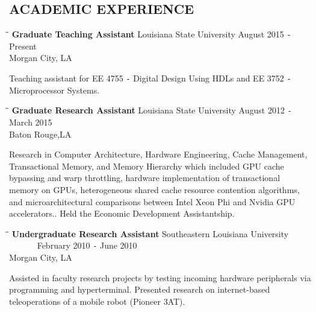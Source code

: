 \documentclass{res}
\begin{document}
\begin{resume}
\section{ACADEMIC EXPERIENCE}
	\vspace{-0.1in}	
	\begin{tabbing}
		\hspace{2.3in}\= \hspace{2.35in}\= \kill %
		{\bf Graduate Teaching Assistant} \>Louisiana State University \> August 2015 \texttt{-} Present\\
		\>Morgan City, LA
	\end{tabbing}\vspace{-20pt}
	Teaching assistant for EE 4755 \texttt{-} Digital Design Using HDLs and EE 3752 \texttt{-} Microprocessor Systems.
	\begin{tabbing}
		\hspace{2.3in}\= \hspace{2.1in}\= \kill %
		{\bf Graduate Research Assistant} \>Louisiana State University     \>August 2012 \texttt{-} March 2015\\
		\>Baton Rouge,LA
	\end{tabbing}\vspace{-20pt}      %
	Research in Computer Architecture, Hardware Engineering, Cache Management, Transactional Memory, and Memory Hierarchy which included GPU cache bypassing and warp throttling, hardware implementation of transactional memory on GPUs, heterogeneous shared cache resource contention algorithms, and microarchitectural comparisons between Intel Xeon Phi and Nvidia GPU accelerators.. Held the Economic Development Assistantship.
	\begin{tabbing}
		\hspace{2.3in}\= \hspace{2.in}\= \kill %
		{\bf Undergraduate Research Assistant} \>Southeastern Louisiana University \> ~~~~~~ February 2010 \texttt{-} June 2010\\
		\>Morgan City, LA
	\end{tabbing}\vspace{-20pt}
	Assisted in faculty research projects by testing incoming hardware peripherals via programming and hyperterminal. Presented research on internet-based teleoperations of a mobile robot (Pioneer 3AT).

   
	    
\end{resume}
\end{document}
